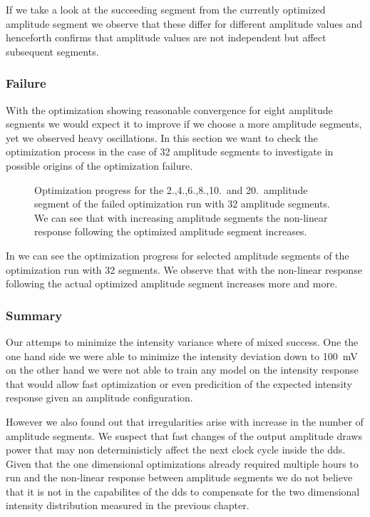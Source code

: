 If we take a look at the succeeding segment from the currently optimized
amplitude segment we observe that these differ for different amplitude
values and henceforth confirms that amplitude values are not independent but
affect subsequent segments.

\subsubsection{Failure}

With the optimization showing reasonable convergence for eight amplitude
segments we would expect it to improve if we choose a more amplitude segments,
yet we observed heavy oscillations. In this section we want to check the
optimization process in the case of \num{32} amplitude segments to investigate
in possible origins of the optimization failure.
\begin{figure}[htb]
  \centering
  \begin{adjustbox}{width=\textwidth}
  \end{adjustbox}
  \caption{Optimization progress for the 2.,4.,6.,8.,10.\ and 20.\ amplitude
    segment of the failed optimization run with \num{32} amplitude segments.
    We can see that with increasing amplitude segments the non-linear response
    following the optimized amplitude segment increases.
  }\label{fig:intensity_optimization_failure}
\end{figure}
In  we can see the optimization
progress for selected amplitude segments of the optimization run with 32
segments. We observe that with the non-linear response following the actual
optimized amplitude segment increases more and more.

\subsubsection{Summary}

Our attemps to minimize the intensity variance where of mixed success. One
the one hand side we were able to minimize the intensity deviation down
to \SI{100}{\milli\volt} on the other hand we were not able to train any
model on the intensity response that would allow fast optimization or even
predicition of the expected intensity response given an amplitude
configuration.

However we also found out that irregularities arise with increase in the
number of amplitude segments. We suspect that fast changes of the output
amplitude draws power that may non deterministicly affect the next clock
cycle inside the \gls{dds}. Given that the one dimensional optimizations
already required multiple hours to run and the non-linear response between
amplitude segments we do not believe that it is not in the capabilites of the
\gls{dds} to compensate for the two dimensional intensity distribution
measured in the previous chapter.
